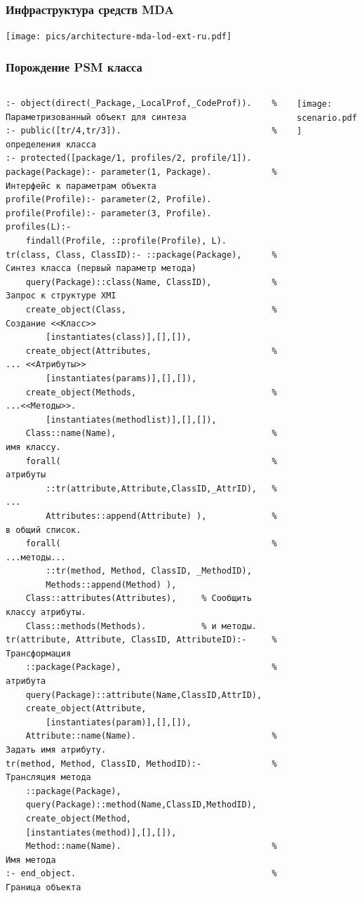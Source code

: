 \documentclass[10pt]{beamer}
\begin{document}
\begin{frame}
  \frametitle{Инфраструктура средств MDA}
  \centering
  \texttt{[image: pics/architecture-mda-lod-ext-ru.pdf]}
\end{frame}

\begin{frame}[fragile]
  \frametitle{Порождение PSM класса}
  \begin{columns}
    \begin{column}{0.6\textwidth}
\begin{verbatim}
:- object(direct(_Package,_LocalProf,_CodeProf)).    % Параметризованный объект для синтеза
:- public([tr/4,tr/3]).                              % определения класса
:- protected([package/1, profiles/2, profile/1]).
package(Package):- parameter(1, Package).            % Интерфейс к параметрам объекта
profile(Profile):- parameter(2, Profile).
profile(Profile):- parameter(3, Profile).
profiles(L):-
    findall(Profile, ::profile(Profile), L).
tr(class, Class, ClassID):- ::package(Package),      % Синтез класса (первый параметр метода)
    query(Package)::class(Name, ClassID),            % Запрос к структуре XMI
    create_object(Class,                             % Создание <<Класс>>
        [instantiates(class)],[],[]),
    create_object(Attributes,                        % ... <<Атрибуты>>
        [instantiates(params)],[],[]),
    create_object(Methods,                           % ...<<Методы>>.
        [instantiates(methodlist)],[],[]),
    Class::name(Name),                               % имя классу.
    forall(                                          % атрибуты
        ::tr(attribute,Attribute,ClassID,_AttrID),   % ...
        Attributes::append(Attribute) ),             % в общий список.
    forall(                                          % ...методы...
        ::tr(method, Method, ClassID, _MethodID),
        Methods::append(Method) ),
    Class::attributes(Attributes),     % Сообщить классу атрибуты.
    Class::methods(Methods).           % и методы.
tr(attribute, Attribute, ClassID, AttributeID):-     % Трансформация
    ::package(Package),                              % атрибута
    query(Package)::attribute(Name,ClassID,AttrID),
    create_object(Attribute,
        [instantiates(param)],[],[]),
    Attribute::name(Name).                           % Задать имя атрибуту.
tr(method, Method, ClassID, MethodID):-              % Трансляция метода
    ::package(Package),
    query(Package)::method(Name,ClassID,MethodID),
    create_object(Method,
    [instantiates(method)],[],[]),
    Method::name(Name).                              % Имя метода
:- end_object.                                       % Граница объекта
\end{verbatim}
    \end{column}
    \begin{column}{0.4\linewidth}
      \texttt{[image: scenario.pdf]}
    \end{column}
  \end{columns}
\end{frame}
\end{document}
